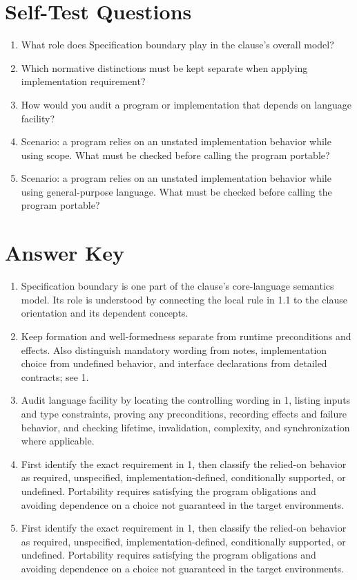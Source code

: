 \documentclass[11pt,letterpaper]{article}
\begin{document}
\section{Self-Test Questions}
\begin{enumerate}
\item What role does Specification boundary play in the clause's overall model?
\item Which normative distinctions must be kept separate when applying implementation requirement?
\item How would you audit a program or implementation that depends on language facility?
\item Scenario: a program relies on an unstated implementation behavior while using scope. What must be checked before calling the program portable?
\item Scenario: a program relies on an unstated implementation behavior while using general-purpose language. What must be checked before calling the program portable?
\end{enumerate}
\clearpage\section{Answer Key}
\begin{enumerate}
\item Specification boundary is one part of the clause's core-language semantics model. Its role is understood by connecting the local rule in 1.1 to the clause orientation and its dependent concepts.
\item Keep formation and well-formedness separate from runtime preconditions and effects. Also distinguish mandatory wording from notes, implementation choice from undefined behavior, and interface declarations from detailed contracts; see 1.
\item Audit language facility by locating the controlling wording in 1, listing inputs and type constraints, proving any preconditions, recording effects and failure behavior, and checking lifetime, invalidation, complexity, and synchronization where applicable.
\item First identify the exact requirement in 1, then classify the relied-on behavior as required, unspecified, implementation-defined, conditionally supported, or undefined. Portability requires satisfying the program obligations and avoiding dependence on a choice not guaranteed in the target environments.
\item First identify the exact requirement in 1, then classify the relied-on behavior as required, unspecified, implementation-defined, conditionally supported, or undefined. Portability requires satisfying the program obligations and avoiding dependence on a choice not guaranteed in the target environments.
\end{enumerate}
\end{document}
